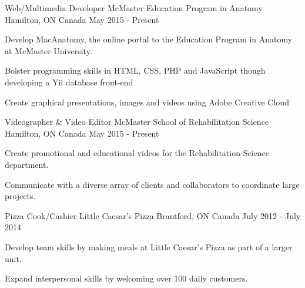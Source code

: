 


\begin{cventries}


\cventry
{Web/Multimedia Developer} %
{McMaster Education Program in Anatomy} %
{Hamilton, ON Canada} %
{May 2015 - Present} %
{ %
\begin{cvitems}
\item {Develop MacAnatomy, the online portal to the Education Program in 
Anatomy at McMaster University.}
\item {Bolster programming skills in HTML, CSS, PHP and JavaScript though 
developing a Yii database front-end}
\item {Create graphical presentations, images and videos using Adobe Creative 
Cloud}
\end{cvitems}
}


\cventry
{Videographer \& Video Editor} %
{McMaster School of Rehabilitation Science} %
{Hamilton, ON Canada} %
{May 2015 - Present} %
{ %
\begin{cvitems}
\item {Create promotional and educational videos for the Rehabilitation Science 
department.}
\item {Communicate with a diverse array of clients and collaborators to 
coordinate large projects.}
\end{cvitems}
}


\cventry
{Pizza Cook/Cashier} %
{Little Caesar's Pizza} %
{Brantford, ON Canada} %
{July 2012 - July 2014} %
{ %
\begin{cvitems}
\item {Develop team skills by making meals at Little Caesar's Pizza as part 
of a larger unit.}
\item {Expand interpersonal skills by welcoming over 100 daily customers.}
\end{cvitems} 
}


\end{cventries}
